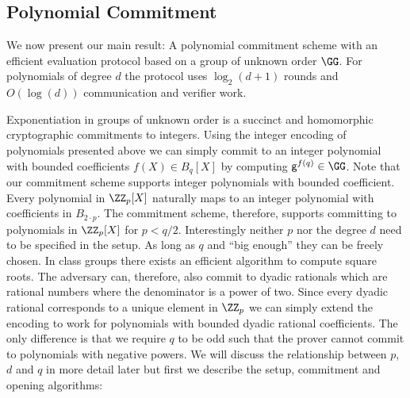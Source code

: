 \documentclass{article}
\theoremstyle{definition}
\begin{document}
\subsection{Polynomial Commitment}

We now present our main result: 
A polynomial commitment scheme with an efficient evaluation protocol based on a group of unknown order $\GG$. For polynomials of degree $d$ the protocol uses $\log_2(d+1)$ rounds and $O(\log(d))$ communication and verifier work.

Exponentiation in groups of unknown order is a succinct and homomorphic cryptographic commitments to integers.
Using the integer encoding of polynomials presented above we can simply commit to an integer polynomial with bounded coefficients $f(X)\in B_{q}[X]$ by computing $\gr{g}^{f(q)} \in \GG$. Note that our commitment scheme supports integer polynomials with bounded coefficient. Every polynomial in $\ZZ_p[X]$ naturally maps to an integer polynomial with coefficients in $B_{2\cdot p}$. The commitment scheme, therefore, supports committing to polynomials in $\ZZ_p[X]$ for $p<q/2$. Interestingly neither $p$ nor the degree $d$ need to be specified in the setup. As long as $q$ and ``big enough'' they can be freely chosen. In class groups there exists an efficient algorithm to compute square roots. The adversary can, therefore, also commit to dyadic rationals which are rational numbers where the denominator is a power of two. Since every dyadic rational corresponds to a unique element in $\ZZ_p$ we can simply extend the encoding to work for polynomials with bounded dyadic rational coefficients. The only difference is that we require $q$ to be odd such that the prover cannot commit to polynomials with negative powers. We will discuss the relationship between $p$, $d$ and $q$ in more detail later but first we describe the setup, commitment and opening algorithms:
\end{document}
